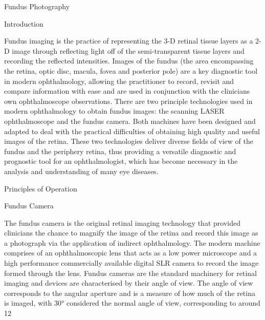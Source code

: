 
Fundus Photography

Introduction

Fundus imaging is the practice of representing the 3-D retinal tissue layers as a 2-D image through reflecting light off of the semi-transparent tissue layers and recording the reflected intensities. Images of the fundus (the area encompassing the retina, optic disc, macula, fovea and posterior pole) are a key diagnostic tool in modern ophthalmology, allowing the practitioner to record, revisit and compare information with ease and are used in conjunction with the clinicians own ophthalmoscope observations. There are two principle technologies used in modern ophthalmology to obtain fundus images: the scanning LASER ophthalmoscope and the fundus camera. Both machines have been designed and adapted to deal with the practical difficulties of obtaining high quality and useful images of the retina. These two technologies deliver diverse fields of view of the fundus and the periphery retina, thus providing a versatile diagnostic and prognostic tool for an ophthalmologist, which has become necessary in the analysis and understanding of many eye diseases. 


Principles of Operation 

Fundus Camera

The fundus camera is the original retinal imaging technology that provided clinicians the chance to magnify the image of the retina and record this image as a photograph via the application of indirect ophthalmology. The modern machine comprises of an ophthalmoscopic lens that acts as a low power microscope and a high performance commercially available digital SLR camera to record the image formed through the lens. Fundus cameras are the standard machinery for retinal imaging and devices are characterised by their angle of view. The angle of view corresponds to the angular aperture and is a measure of how much of the retina is imaged, with 30° considered the normal angle of view, corresponding to around 12%

